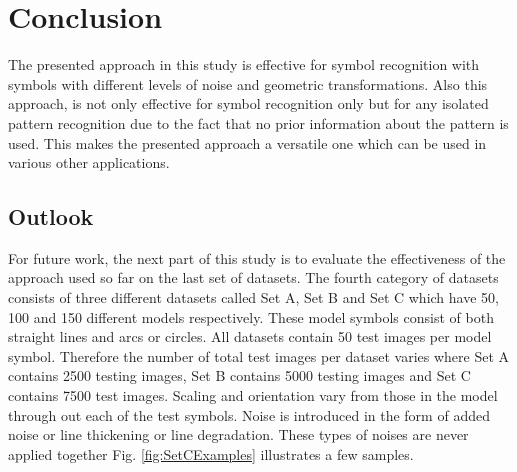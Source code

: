 \chapter{Conclusion}

The presented approach in this study is effective for symbol recognition with symbols with different levels of noise and geometric transformations. Also this approach, is not only effective for symbol recognition only but for any isolated pattern recognition due to the fact that no prior information about the pattern is used. This makes the presented approach a versatile one which can be used in various other applications. \\

\section{Outlook}
For future work, the next part of this study is to evaluate the effectiveness of the approach used so far on the last set of datasets. The fourth category of datasets consists of three different datasets called Set A, Set B and Set C which have 50, 100 and 150 different models respectively. These model symbols consist of both straight lines and arcs or circles.  All datasets contain 50 test images per model symbol. Therefore the number of total test images per dataset varies where Set A contains 2500 testing images, Set B contains 5000 testing images and Set C contains 7500 test images. Scaling and orientation vary from those in the model through out each of the test symbols. Noise is introduced in the form of added noise or line thickening or line degradation. These types of noises are never applied together Fig. \ref{fig:SetCExamples} illustrates a few samples.\\
 
